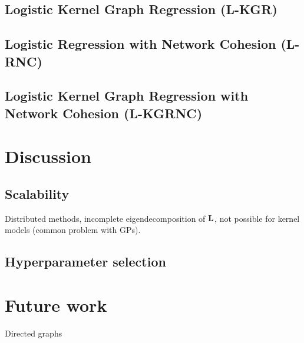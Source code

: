 \subsection*{Logistic Kernel Graph Regression (L-KGR)}

\subsection*{Logistic Regression with Network Cohesion (L-RNC)}

\subsection*{Logistic Kernel Graph Regression with Network Cohesion (L-KGRNC)}



\section{Discussion}

\subsection*{Scalability}

Distributed methods, incomplete eigendecomposition of $\mathbf{L}$, not possible for kernel models (common problem with GPs). 

\subsection*{Hyperparameter selection}

\section{Future work}

Directed graphs